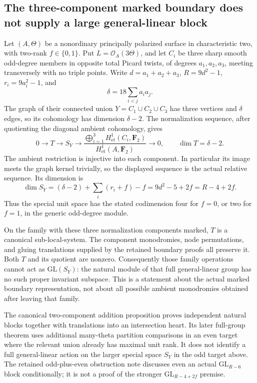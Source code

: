 \subsection*{The three-component marked boundary does not supply a large general-linear block}

Let \((A,\Theta)\) be a nonordinary principally polarized surface in
characteristic two, with two-rank \(f\in\{0,1\}\). Put
\(L=\mathcal O_A(3\Theta)\), and let \(C_i\) be three sharp smooth
odd-degree members in opposite total Picard twists, of degrees
\(a_1,a_2,a_3\), meeting transversely with no triple points. Write
\(d=a_1+a_2+a_3\), \(R=9d^2-1\),
\(r_i=9a_i^2-1\), and
\[
 \delta=18\sum_{i<j}a_i a_j.
\]
The graph of their connected union \(Y=C_1\cup C_2\cup C_3\)
has three vertices and \(\delta\) edges, so its cohomology has
dimension \(\delta-2\). The normalization sequence, after quotienting
the diagonal ambient cohomology, gives
\[
 0\longrightarrow T\longrightarrow S_Y\longrightarrow
 \frac{\bigoplus_{i=1}^3 H^1_{\mathrm{et}}(C_i,\mathbf F_2)}
      {H^1_{\mathrm{et}}(A,\mathbf F_2)}
 \longrightarrow0,
 \qquad \dim T=\delta-2.
\]
The ambient restriction is injective into each component. In particular
its image meets the graph kernel trivially, so the displayed sequence
is the actual relative sequence. Its dimension is
\[
 \dim S_Y=(\delta-2)+\sum_i(r_i+f)-f
          =9d^2-5+2f=R-4+2f.
\]
Thus the special unit space has the stated codimension four for
\(f=0\), or two for \(f=1\), in the generic odd-degree module.

On the family with these three normalization components marked,
\(T\) is a canonical sub-local-system. The component monodromies,
node permutations, and gluing translations supplied by the retained
boundary proofs all preserve it. Both \(T\) and its quotient are
nonzero. Consequently those family operations cannot act as
\(\mathrm{GL}(S_Y)\): the natural module of that full general-linear
group has no such proper invariant subspace. This is a statement
about the actual marked boundary representation, not about all
possible ambient monodromies obtained after leaving that family.

The canonical two-component addition proposition proves independent
natural blocks together with translations into an intersection heart.
Its later full-group theorem uses additional many-theta partition
comparisons in an even target where the relevant union already has
maximal unit rank. It does not identify a full general-linear action
on the larger special space \(S_Y\) in the odd target above. The
retained odd-plus-even obstruction note discusses even an actual
\(\mathrm{GL}_{R-6}\) block conditionally; it is not a proof of the
stronger \(\mathrm{GL}_{R-4+2f}\) premise.

